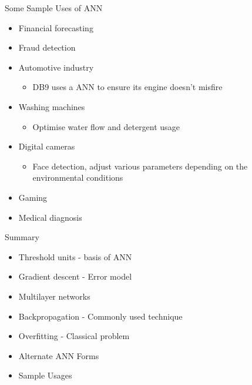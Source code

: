 \documentclass[%
pdf,
colorBG,
slideColor,
tcrico,
]{prosper}
\begin{document}
\begin{slide}{Some Sample Uses of ANN} 
\tiny
\begin{itemize}
 \item Financial forecasting
 \item Fraud detection
\item Automotive industry
	\begin{itemize}
	 \item DB9 uses a ANN to ensure its engine doesn't misfire
 	\end{itemize}
\item Washing machines 
	\begin{itemize}
	 \item Optimise water flow and detergent usage
 	\end{itemize}
\item Digital cameras
	\begin{itemize}
	 \item Face detection, adjust various parameters depending on the environmental conditions
 	\end{itemize}
\item Gaming
\item Medical diagnosis
\end{itemize}
\end{slide}


\begin{slide}{Summary}
\begin{itemize}
\item Threshold units - basis of ANN
\item Gradient descent - Error model
\item Multilayer networks 
\item Backpropagation - Commonly used technique
\item Overfitting - Classical problem
\item Alternate ANN Forms
\item Sample Usages
\end{itemize}
\end{slide}
\end{document}
